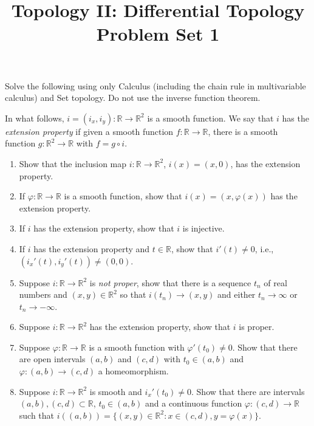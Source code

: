 \documentclass[12pt]{article}
\newcommand{\R}{\mathbb{R}}
\begin{document}
\title{Topology II: Differential Topology\\
Problem Set 1} 
\date{}
\maketitle

\thispagestyle{empty}

Solve the following using only Calculus (including the chain rule in multivariable calculus) and Set topology. Do not use the inverse function theorem. 

In what follows, $i=(i_x,i_y):\R\to\R^2$ is a smooth function. We say that $i$ has the \textit{extension property} if given a smooth function $f:\R\to\R$, there is a smooth function $g:\R^2\to \R$ with $f=g\circ i$.

\begin{enumerate}

\item Show that the inclusion map $i:\R\to\R^2$, $i(x)=(x,0)$, has the extension property.

\item If $\varphi:\R\to\R$ is a smooth function, show that $i(x)=(x,\varphi(x))$ has the extension property.

\item If $i$ has the extension property, show that $i$ is injective.

\item If $i$ has the extension property and $t\in\R$, show that $i'(t)\neq 0$, i.e., $(i_x'(t),i_y'(t))\neq (0,0)$.

\item Suppose $i:\R\to \R^2$ is \textit{not proper}, show that there is a sequence $t_n$ of real numbers and $(x,y)\in\R^2$ so that $i(t_n)\to (x,y)$ and either $t_n\to \infty$ or $t_n\to -\infty$.

\item Suppose $i:\R\to\R^2$ has the extension property, show that $i$ is proper.

\item Suppose $\varphi:\R\to \R$ is a smooth function with $\varphi'(t_0)\neq 0$. Show that there are open intervals $(a,b)$ and $(c,d)$ with $t_0\in (a,b)$ and $\varphi:(a,b)\to (c,d)$ a homeomorphism.

\item\label{locgp} Suppose $i:\R\to\R^2$ is smooth and $i_x'(t_0)\neq 0$. Show that there are  intervals $(a,b),(c,d)\subset \R$, $t_0\in (a,b)$  and a continuous function $\varphi:(c,d)\to\R$  such that $i((a,b))=\{(x,y)\in\R^2: x\in (c,d), y=\varphi(x)\}$.


\end{enumerate}
\end{document}
